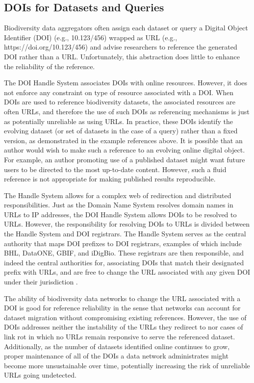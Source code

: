 \subsection*{DOIs for Datasets and Queries}
Biodiversity data aggregators often assign each dataset or query a Digital Object Identifier (DOI) \citep{Paskin_2009} (e.g., 10.123/456) wrapped as URL (e.g., https://doi.org/10.123/456) and advise researchers to reference the generated DOI rather than a URL. Unfortunately, this abstraction does little to enhance the reliability of the reference.

The DOI Handle System \citep{Paskin_2009} associates DOIs with online resources. However, it does not enforce any constraint on type of resource associated with a DOI. When DOIs are used to reference biodiversity datasets, the associated resources are often URLs, and therefore the use of such DOIs as referencing mechanisms is just as potentially unreliable as using URLs. In practice, these DOIs identify the evolving dataset (or set of datasets in the case of a query) rather than a fixed version, as demonstrated in the example references above. It is possible that an author would wish to make such a reference to an evolving online digital object. For example, an author promoting use of a published dataset might want future users to be directed to the most up-to-date content. However, such a fluid reference is not appropriate for making published results reproducible.

The Handle System allows for a complex web of redirection and distributed responsibilities. Just as the Domain Name System resolves domain names in URLs to IP addresses, the DOI Handle System allows DOIs to be resolved to URLs. However, the responsibility for resolving DOIs to URLs is divided between the Handle System and DOI registrars. The Handle System serves as the central authority that maps DOI prefixes to DOI registrars, examples of which include BHL, DataONE, GBIF, and iDigBio. These registrars are then responsible, and indeed the central authorities for, associating DOIs that match their designated prefix with URLs, and are free to change the URL associated with any given DOI under their jurisdiction \citep{Paskin_2009,DOI_2018}.

The ability of biodiversity data networks to change the URL associated with a DOI is good for reference reliability in the sense that networks can account for dataset migration without compromising existing references. However, the use of DOIs addresses neither the instability of the URLs they redirect to nor cases of link rot in which no URLs remain responsive to serve the referenced dataset. Additionally, as the number of datasets identified online continues to grow, proper maintenance of all of the DOIs a data network administrates might become more unsustainable over time, potentially increasing the risk of unreliable URLs going undetected.

